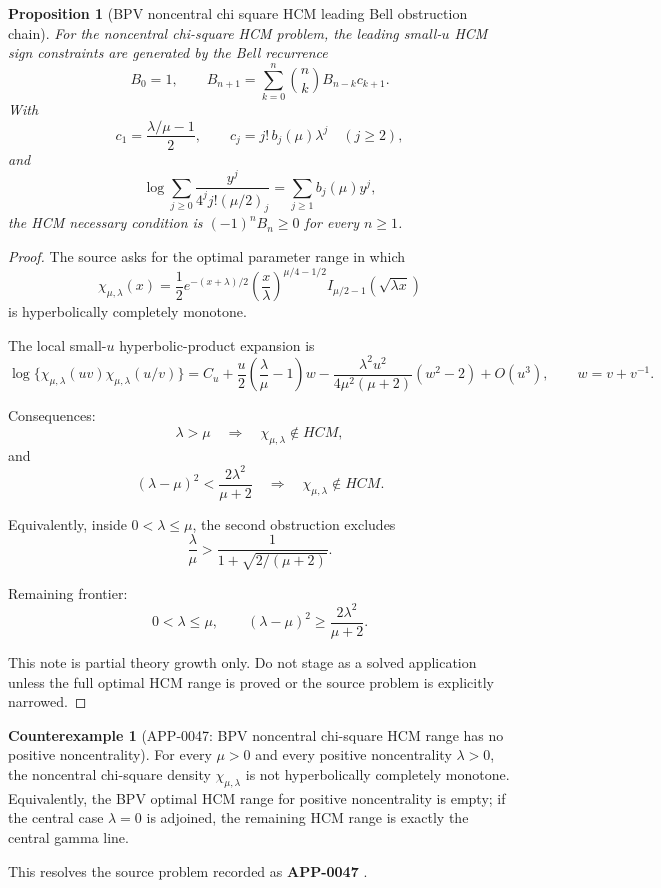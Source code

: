 \documentclass[11pt]{article}
\numberwithin{equation}{section}
\newtheorem{proposition}[theorem]{Proposition}
\theoremstyle{definition}
\newtheorem{counterexample}[theorem]{Counterexample}
\theoremstyle{remark}
\newcommand{\1}{\mathbf 1}
\begin{document}
\begin{proposition}[BPV noncentral chi square HCM leading Bell obstruction chain]
\label{res:bpv-noncentral-chi-square-hcm-leading-bell-obstruction-chain}
For the noncentral chi-square HCM problem, the leading small-\(u\) HCM sign constraints are generated by the Bell recurrence
\[
B_0=1,\qquad B_{n+1}=\sum_{k=0}^{n}\binom{n}{k}B_{n-k}c_{k+1}.
\]
With
\[
c_1=\frac{\lambda/\mu-1}{2},\qquad c_j=j!\,b_j(\mu)\lambda^j\quad(j\ge2),
\]
and
\[
\log\sum_{j\ge0}\frac{y^j}{4^j j!(\mu/2)_j}=\sum_{j\ge1}b_j(\mu)y^j,
\]
the HCM necessary condition is \((-1)^nB_n\ge0\) for every \(n\ge1\).
\end{proposition}

\begin{proof}
The source asks for the optimal parameter range in which
\[
\chi_{\mu,\lambda}(x)
=\frac12 e^{-(x+\lambda)/2}
\left(\frac{x}{\lambda}\right)^{\mu/4-1/2}
I_{\mu/2-1}(\sqrt{\lambda x})
\]
is hyperbolically completely monotone.

The local small-\(u\) hyperbolic-product expansion is
\[
\log\{\chi_{\mu,\lambda}(uv)\chi_{\mu,\lambda}(u/v)\}
=C_u+\frac{u}{2}\left(\frac{\lambda}{\mu}-1\right)w
-\frac{\lambda^2u^2}{4\mu^2(\mu+2)}(w^2-2)
+O(u^3),
\qquad w=v+v^{-1}.
\]

Consequences:
\[
\lambda>\mu\quad\Longrightarrow\quad \chi_{\mu,\lambda}\notin HCM,
\]
and
\[
(\lambda-\mu)^2<\frac{2\lambda^2}{\mu+2}
\quad\Longrightarrow\quad
\chi_{\mu,\lambda}\notin HCM.
\]

Equivalently, inside \(0<\lambda\le\mu\), the second obstruction excludes
\[
\frac{\lambda}{\mu}>
\frac{1}{1+\sqrt{2/(\mu+2)}}.
\]

Remaining frontier:
\[
0<\lambda\le\mu,\qquad
(\lambda-\mu)^2\ge\frac{2\lambda^2}{\mu+2}.
\]

This note is partial theory growth only. Do not stage as a solved application unless the full optimal HCM range is proved or the source problem is explicitly narrowed.
\end{proof}

\begin{counterexample}[APP-0047: BPV noncentral chi-square HCM range has no positive noncentrality]
\label{res:bpv-noncentral-chi-square-hcm-no-positive-noncentrality}
For every \(\mu>0\) and every positive noncentrality \(\lambda>0\), the noncentral chi-square density \(\chi_{\mu,\lambda}\) is not hyperbolically completely monotone. Equivalently, the BPV optimal HCM range for positive noncentrality is empty; if the central case \(\lambda=0\) is adjoined, the remaining HCM range is exactly the central gamma line.



This resolves the source problem recorded as \textbf{APP-0047} \cite{app-app-0047-source}.
\end{counterexample}
\end{document}
